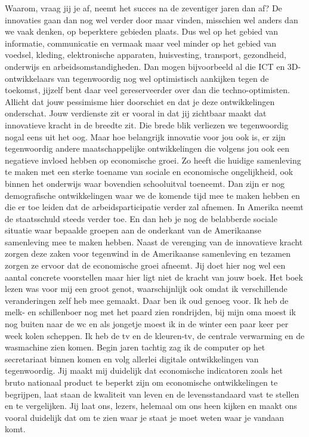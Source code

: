 \documentclass[]{book}
\begin{document}
Waarom, vraag jij je af, neemt het succes na de zeventiger jaren dan af?
De innovaties gaan dan nog wel verder door maar vinden, misschien wel
anders dan we vaak denken, op beperktere gebieden plaats. Dus wel op het
gebied van informatie, communicatie en vermaak maar veel minder op het
gebied van voedsel, kleding, elektronische apparaten, huisvesting,
transport, gezondheid, onderwijs en arbeidsomstandigheden. Dan mogen
bijvoorbeeld al die ICT en 3D-ontwikkelaars van tegenwoordig nog wel
optimistisch aankijken tegen de toekomst, jijzelf bent daar veel
gereserveerder over dan die techno-optimisten. Allicht dat jouw
pessimisme hier doorschiet en dat je deze ontwikkelingen onderschat.
Jouw verdienste zit er vooral in dat jij zichtbaar maakt dat innovatieve
kracht in de breedte zit. Die brede blik verliezen we tegenwoordig nogal
eens uit het oog. Maar hoe belangrijk innovatie voor jou ook is, er zijn
tegenwoordig andere maatschappelijke ontwikkelingen die volgens jou ook
een negatieve invloed hebben op economische groei. Zo heeft die huidige
samenleving te maken met een sterke toename van sociale en economische
ongelijkheid, ook binnen het onderwijs waar bovendien schooluitval
toeneemt. Dan zijn er nog demografische ontwikkelingen waar we de
komende tijd mee te maken hebben en die er toe leiden dat de
arbeidsparticipatie verder zal afnemen. In Amerika neemt de staatsschuld
steeds verder toe. En dan heb je nog de belabberde sociale situatie waar
bepaalde groepen aan de onderkant van de Amerikaanse samenleving mee te
maken hebben. Naast de verenging van de innovatieve kracht zorgen deze
zaken voor tegenwind in de Amerikaanse samenleving en tezamen zorgen ze
ervoor dat de economische groei afneemt. Jij doet hier nog wel een
aantal concrete voorstellen maar hier ligt niet de kracht van jouw boek.
Het boek lezen was voor mij een groot genot, waarschijnlijk ook omdat ik
verschillende veranderingen zelf heb mee gemaakt. Daar ben ik oud genoeg
voor. Ik heb de melk- en schillenboer nog met het paard zien rondrijden,
bij mijn oma moest ik nog buiten naar de wc en als jongetje moest ik in
de winter een paar keer per week kolen scheppen. Ik heb de tv en de
kleuren-tv, de centrale verwarming en de wasmachine zien komen. Begin
jaren tachtig zag ik de computer op het secretariaat binnen komen en
volg allerlei digitale ontwikkelingen van tegenwoordig. Jij maakt mij
duidelijk dat economische indicatoren zoals het bruto nationaal product
te beperkt zijn om economische ontwikkelingen te begrijpen, laat staan
de kwaliteit van leven en de levensstandaard vast te stellen en te
vergelijken. Jij laat ons, lezers, helemaal om ons heen kijken en maakt
ons vooral duidelijk dat om te zien waar je staat je moet weten waar je
vandaan komt.
\end{document}
